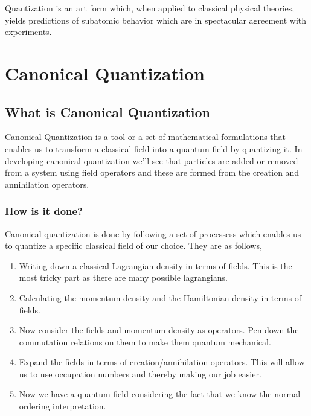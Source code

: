 \begin{savequote}[45mm]
Quantization is an art form which, when applied to classical physical theories, yields predictions of subatomic behavior which are in spectacular agreement with experiments. 
\end{savequote}
\chapter{Canonical Quantization}
\section{What is Canonical Quantization}
Canonical Quantization is a tool or a set of mathematical formulations that enables us to transform a classical field into a quantum field by quantizing it. 
In developing canonical quantization we’ll see that particles are added or removed from a system  using field operators and these are formed from the creation and annihilation operators. 
\subsection{How is it done?}
Canonical quantization is done by following a set of processess which enables us to quantize a specific classical field of our choice. They are as follows, 
\begin{enumerate}[I]
    \item Writing down a classical Lagrangian density in terms of fields. This is the most tricky part as there are many possible lagrangians.  
    \item Calculating the momentum density and the Hamiltonian density in terms of fields.
    \item Now consider the fields and momentum density as operators. Pen down the commutation relations on them to make them quantum mechanical.
    \item Expand the fields in terms of creation/annihilation operators.
This will allow us to use occupation numbers and thereby making our job easier. 
  \item Now we have a quantum field considering the fact that we know the normal ordering interpretation. 
\end{enumerate}
